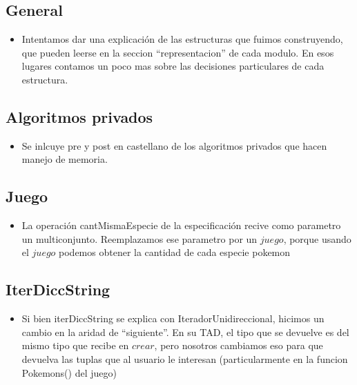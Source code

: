 
\subsection{General}

\begin{itemize}

\item{Intentamos dar una explicaci\'on de las estructuras que fuimos construyendo, que pueden leerse en la seccion ``representacion'' de cada modulo. En esos lugares contamos un poco mas sobre las decisiones particulares de cada estructura.}

\end{itemize}


\subsection{Algoritmos privados}

\begin{itemize}

\item{Se inlcuye pre y post en castellano de los algoritmos privados que hacen manejo de memoria.}

\end{itemize}


\subsection{Juego}

\begin{itemize}
\item{La operaci\'on cantMismaEspecie de la especificaci\'on recive como parametro un multiconjunto. 
Reemplazamos ese parametro por un $juego$, porque usando el $juego$ podemos obtener la cantidad de cada especie pokemon}

\end{itemize}


\subsection{IterDiccString}

\begin{itemize}

\item{Si bien iterDiccString se explica con IteradorUnidireccional, hicimos un cambio en la aridad de ``siguiente''. En su TAD, el tipo que se devuelve es del mismo tipo que recibe en $crear$, pero nosotros cambiamos eso para que devuelva las tuplas que al usuario le interesan (particularmente en la funcion Pokemons() del juego)}

\end{itemize}


